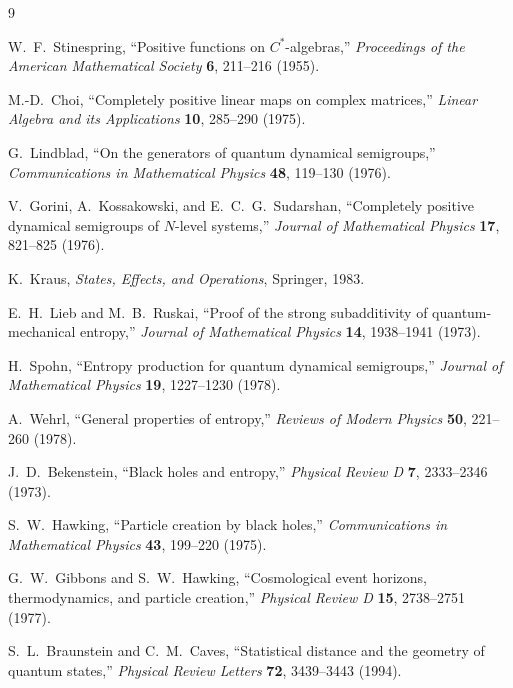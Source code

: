 \documentclass[11pt]{article}
\theoremstyle{remark}
\begin{document}
\begin{thebibliography}{9}

W.\ F.\ Stinespring, ``Positive functions on $C^*$-algebras,''
\emph{Proceedings of the American Mathematical Society} \textbf{6}, 211--216 (1955).

M.-D.\ Choi, ``Completely positive linear maps on complex matrices,''
\emph{Linear Algebra and its Applications} \textbf{10}, 285--290 (1975).

G.\ Lindblad, ``On the generators of quantum dynamical semigroups,''
\emph{Communications in Mathematical Physics} \textbf{48}, 119--130 (1976).

V.\ Gorini, A.\ Kossakowski, and E.\ C.\ G.\ Sudarshan, ``Completely positive dynamical semigroups of $N$-level systems,''
\emph{Journal of Mathematical Physics} \textbf{17}, 821--825 (1976).

K.\ Kraus, \emph{States, Effects, and Operations}, Springer, 1983.

E.\ H.\ Lieb and M.\ B.\ Ruskai, ``Proof of the strong subadditivity of quantum-mechanical entropy,''
\emph{Journal of Mathematical Physics} \textbf{14}, 1938--1941 (1973).

H.\ Spohn, ``Entropy production for quantum dynamical semigroups,''
\emph{Journal of Mathematical Physics} \textbf{19}, 1227--1230 (1978).

A.\ Wehrl, ``General properties of entropy,''
\emph{Reviews of Modern Physics} \textbf{50}, 221--260 (1978).

J.\ D.\ Bekenstein, ``Black holes and entropy,''
\emph{Physical Review D} \textbf{7}, 2333--2346 (1973).

S.\ W.\ Hawking, ``Particle creation by black holes,''
\emph{Communications in Mathematical Physics} \textbf{43}, 199--220 (1975).

G.\ W.\ Gibbons and S.\ W.\ Hawking, ``Cosmological event horizons, thermodynamics, and particle creation,''
\emph{Physical Review D} \textbf{15}, 2738--2751 (1977).

S.\ L.\ Braunstein and C.\ M.\ Caves, ``Statistical distance and the geometry of quantum states,''
\emph{Physical Review Letters} \textbf{72}, 3439--3443 (1994).


\end{thebibliography}
\end{document}

